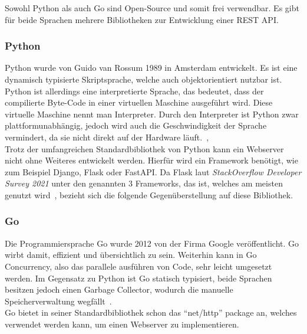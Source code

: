 Sowohl Python als auch Go sind \gls{Open-Source} und somit frei verwendbar. Es 
gibt für beide Sprachen mehrere Bibliotheken zur Entwicklung einer \gls{REST} 
\gls{API}.

\subsubsection{Python}
Python wurde von Guido van Rossum 1989 in Amsterdam entwickelt. Es ist eine 
\gls{dynamisch typisiert}e Skriptsprache, welche auch \gls{objektorientiert} nutzbar 
ist. Python ist allerdings eine interpretierte Sprache, das bedeutet, dass der 
compilierte Byte-Code in einer virtuellen Maschine ausgeführt wird. Diese 
virtuelle Maschine nennt man Interpreter. Durch den Interpreter ist Python 
zwar plattformunabhängig, jedoch wird auch die Geschwindigkeit der Sprache vermindert,
da sie nicht direkt auf der Hardware läuft.~\cite{ErKa20},\\

Trotz der umfangreichen Standardbibliothek von Python kann ein Webserver nicht
ohne Weiteres entwickelt werden. Hierfür wird ein \gls{Framework} benötigt, wie 
zum Beispiel Django, Flask oder FastAPI. Da Flask laut \textit{StackOverflow 
Developer Survey 2021} unter den genannten 3 Frameworks, das ist, welches am 
meisten genutzt wird~\cite{Sta21}, bezieht sich die folgende Gegenüberstellung 
auf diese Bibliothek. \\

\subsubsection{Go}
Die Programmiersprache Go wurde 2012 von der Firma Google veröffentlicht. Go 
wirbt damit, effizient und übersichtlich zu sein. Weiterhin kann in Go 
Concurrency, also das parallele ausführen von Code, sehr leicht umgesetzt werden.
Im Gegensatz zu Python ist Go \gls{statisch typisiert}, beide Sprachen besitzen jedoch
einen \gls{Garbage Collector}, wodurch die manuelle Speicherverwaltung
wegfällt~\cite{Freeman2022}. \\

Go bietet in seiner Standardbibliothek schon das ``net/http'' package an, welches
verwendet werden kann, um einen Webserver zu implementieren. 


